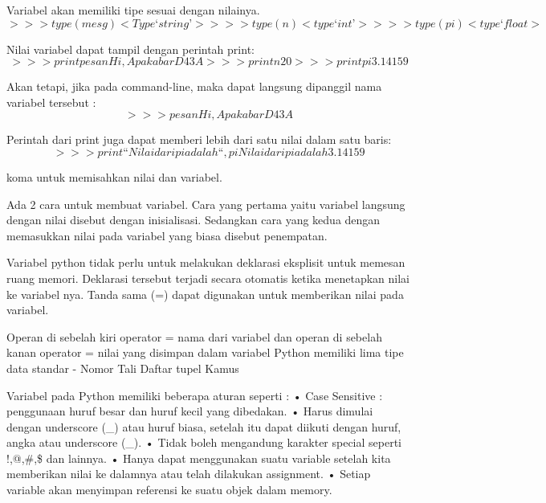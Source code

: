 Variabel akan memiliki tipe  sesuai dengan nilainya.
\begin{equation}
>>>type(mesg)
<Type ‘string’>
>>> type (n)
<type ‘int’>
>>> type (pi)
<type ‘float>
\end{equation}

Nilai variabel dapat tampil dengan perintah print:
\begin{equation}
>>> print pesan
Hi, Apa kabar D43A
>>> print n
20
>>>print pi
3.14159
\end{equation}

Akan tetapi, jika pada command-line, maka dapat langsung dipanggil nama variabel tersebut :
\begin{equation}
>>> pesan
Hi, Apa kabar D43A
\end{equation}

Perintah dari print juga dapat memberi lebih dari satu nilai dalam satu baris:
\begin{equation}
>>> print “Nilai dari pi adalah “,pi
Nilai dari pi adalah 3.14159
\end{equation}

koma untuk memisahkan nilai dan variabel.\cite{utami2004logika}

Ada 2 cara untuk membuat variabel. Cara yang pertama yaitu variabel langsung dengan nilai disebut dengan inisialisasi. Sedangkan cara yang kedua dengan memasukkan nilai pada variabel yang biasa disebut penempatan.\cite{santoso2009bahasa}

Variabel python tidak perlu untuk melakukan deklarasi eksplisit untuk memesan ruang memori. Deklarasi tersebut terjadi secara otomatis ketika menetapkan nilai ke variabel nya.
Tanda sama (=) dapat digunakan untuk memberikan nilai pada variabel.

Operan di sebelah kiri operator =  nama dari variabel dan operan di sebelah kanan operator = nilai yang disimpan dalam variabel
Python memiliki lima tipe data standar -
Nomor
Tali
Daftar
tupel
Kamus

Variabel pada Python memiliki beberapa aturan seperti :
•    Case Sensitive : penggunaan huruf besar dan huruf kecil yang dibedakan.
•    Harus dimulai dengan underscore (_) atau huruf biasa, setelah itu dapat diikuti dengan huruf, angka atau underscore (_).
•    Tidak boleh mengandung karakter special seperti !,@,\#,\$ dan lainnya.
•    Hanya dapat menggunakan suatu variable setelah kita memberikan nilai ke dalamnya atau telah dilakukan assignment.
•    Setiap variable akan menyimpan referensi ke suatu objek dalam memory.\cite{santoso2009bahasa}

